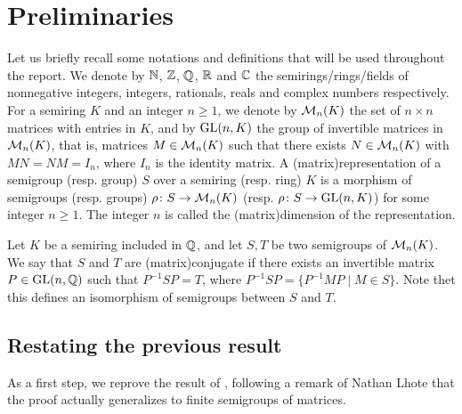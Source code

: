 \section{Preliminaries}

Let us briefly recall some notations and definitions that will be used
throughout the report. We denote by $\Nat$, $\Int$, $\Rat$, $\Real$ and $\Comp$
the semirings/rings/fields of nonnegative integers, integers, rationals, reals
and complex numbers respectively. For a semiring $K$ and an integer $n \geq 1$,
we denote by $\Mat[n]{K}$ the set of $n\times n$ matrices with entries in $K$,
and by $\GL[n]{K}$ the group of invertible matrices in $\Mat[n]{K}$, that is,
matrices $M \in \Mat[n]{K}$ such that there exists $N \in \Mat[n]{K}$ with $MN
= NM = I_n$, where $I_n$ is the identity matrix. A \intro(matrix){representation}
of a semigroup (resp. group) $S$ over a semiring (resp. ring) $K$ is a
morphism of semigroups (resp. groups) $\rho \colon S \to \Mat[n]{K}$ (resp.
$\rho \colon S \to \GL[n]{K}$) for some integer $n \geq 1$. The integer $n$ is
called the \intro(matrix){dimension} of the representation.


Let $K$ be a semiring included in $\Rat$, and let $S, T$ be two semigroups of
$\Mat[n]{K}$. We say that $S$ and $T$ are \intro(matrix){conjugate} if there
exists an invertible matrix $P \in \GL[n]{\Rat}$ such that $P^{-1}SP = T$,
where $P^{-1}SP = \{P^{-1}MP \mid M \in S\}$. Note thet this defines an
isomorphism of semigroups between $S$ and $T$.




\subsection{Restating the previous result}

As a first step, we reprove the result of \cite{BUHAKISTTA20}, following
a remark of Nathan Lhote that the proof actually generalizes to 
finite semigroups of matrices.

